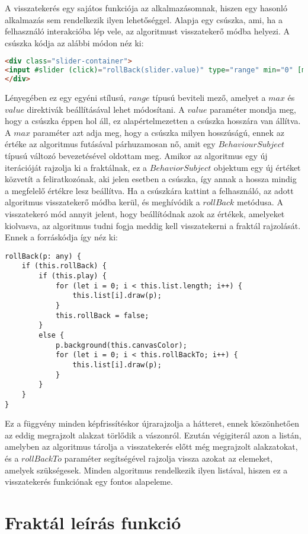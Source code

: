 A visszatekerés egy sajátos funkciója az alkalmazásomnak, hiszen egy hasonló alkalmazás sem rendelkezik ilyen lehetőséggel. Alapja egy csúszka, ami, ha a felhasználó interakcióba lép vele, az algoritmust visszatekerő módba helyezi. A csúszka kódja az alábbi módon néz ki:
\begin{lstlisting}[language=html]
<div class="slider-container">
<input #slider (click)="rollBack(slider.value)" type="range" min="0" [max]="sliderLength" [value]="sliderLength" class="slider" id="myRange">
</div>
\end{lstlisting}
Lényegében ez egy egyéni stílusú, $range$ típusú beviteli mező, amelyet a $max$ és $value$ direktivák beállításával lehet módosítani. A $value$ paraméter mondja meg, hogy a csúszka éppen hol áll, ez alapértelmezetten a csúszka hosszára van állítva. A $max$ paraméter azt adja meg, hogy a csúszka milyen hosszúságú, ennek az értéke az algoritmus futásával párhuzamosan nő, amit egy $BehaviourSubject$ típusú változó bevezetésével oldottam meg. Amikor az algoritmus egy új iterációját rajzolja ki a fraktálnak, ez a $BehaviorSubject$ objektum egy új értéket közvetít a feliratkozónak, aki jelen esetben a csúszka, így annak a hossza mindig a megfelelő értékre lesz beállítva. Ha a csúszkára kattint a felhasználó, az adott algoritmus visszatekerő módba kerül, és meghívódik a $rollBack$ metódusa. A visszatekeró mód annyit jelent, hogy beállítódnak azok az értékek, amelyeket kiolvasva, az algoritmus tudni fogja meddig kell visszatekerni a fraktál rajzolását. Ennek a forráskódja így néz ki:
\begin{lstlisting}
rollBack(p: any) {
	if (this.rollBack) {
		if (this.play) {
			for (let i = 0; i < this.list.length; i++) {
				this.list[i].draw(p);
			}
			this.rollBack = false;
		}
		else {
			p.background(this.canvasColor);
			for (let i = 0; i < this.rollBackTo; i++) {
				this.list[i].draw(p);
			}
		}
	}
}
\end{lstlisting}
Ez a függvény minden képfrissítéskor újrarajzolja a hátteret, ennek köszönhetően az eddig megrajzolt alakzat törlődik a vászonról. Ezután végigiterál azon a listán, amelyben az algoritmus tárolja a visszatekerés előtt még megrajzolt alakzatokat, és a $rollBackTo$ paraméter segítségével rajzolja vissza azokat az elemeket, amelyek szükségesek. Minden algoritmus rendelkezik ilyen listával, hiszen ez a visszatekerés funkciónak egy fontos alapeleme.


\section{Fraktál leírás funkció}

